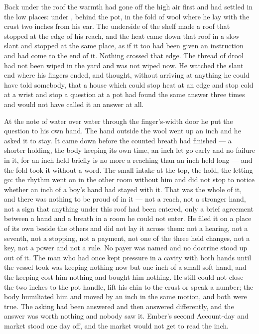 \scenebreak

Back under the roof the warmth had gone off the high air first and had settled in the low places: under , behind the pot, in the fold of wool where he lay with the crust two inches from his ear. The underside of the shelf made a roof that stopped at the edge of his reach, and the heat came down that roof in a slow slant and stopped at the same place, as if it too had been given an instruction and had come to the end of it. Nothing crossed that edge. The thread of drool had not been wiped in the yard and was not wiped now. He watched the slant end where his fingers ended, and thought, without arriving at anything he could have told somebody, that a house which could stop heat at an edge and stop cold at a wrist and stop a question at a pot had found the same answer three times and would not have called it an answer at all.

At the note of water over water through the finger's-width door he put the question to his own hand. The hand outside the wool went up an inch and he asked it to stay. It came down before the counted breath had finished --- a shorter holding, the body keeping its own time, an inch let go early and no failure in it, for an inch held briefly is no more a reaching than an inch held long --- and the fold took it without a word. The small intake at the top, the hold, the letting go: the rhythm went on in the other room without him and did not stop to notice whether an inch of a boy's hand had stayed with it. That was the whole of it, and there was nothing to be proud of in it --- not a reach, not a stronger hand, not a sign that anything under this roof had been entered, only a brief agreement between a hand and a breath in a room he could not enter. He filed it on a place of its own beside the others and did not lay it across them: not a hearing, not a seventh, not a stopping, not a payment, not one of the three held changes, not a key, not a power and not a rule. No payer was named and no doctrine stood up out of it. The man who had once kept pressure in a cavity with both hands until the vessel took was keeping nothing now but one inch of a small soft hand, and the keeping cost him nothing and bought him nothing. He still could not close the two inches to the pot handle, lift his chin to the crust or speak a number; the body humiliated him and moved by an inch in the same motion, and both were true. The asking had been answered and then answered differently, and the answer was worth nothing and nobody saw it. Ember's second Account-day and market stood one day off, and the market would not get to read the inch.

